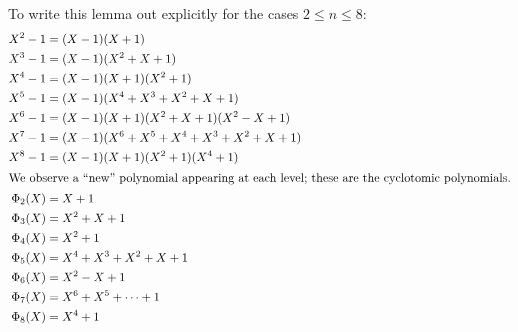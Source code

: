 \documentclass[11pt]{scrartcl}
\begin{document}
\begin{example}
  To write this lemma out explicitly for the cases $2 \le n \le 8$:
  \begin{align*}
    X^2-1 &= (X-1)(X+1) \\
    X^3-1 &= (X-1)(X^2+X+1) \\
    X^4-1 &= (X-1)(X+1)(X^2+1) \\
    X^5-1 &= (X-1)(X^4+X^3+X^2+X+1) \\
    X^6-1 &= (X-1)(X+1)(X^2+X+1)(X^2-X+1) \\
    X^7-1 &= (X-1)(X^6+X^5+X^4+X^3+X^2+X+1) \\
    X^8-1 &= (X-1)(X+1)(X^2+1)(X^4+1)  \\
  \intertext{We observe a ``new'' polynomial appearing at each level;
  these are the cyclotomic polynomials.}
    \Phi_2(X) &= X+1\\
    \Phi_3(X) &= X^2+X+1 \\
    \Phi_4(X) &= X^2+1 \\
    \Phi_5(X) &= X^4+X^3+X^2+X+1 \\
    \Phi_6(X) &= X^2-X+1 \\
    \Phi_7(X) &= X^6+X^5+\dots+1\\
    \Phi_8(X) &= X^4+1
  \end{align*}
\end{example}
\end{document}
